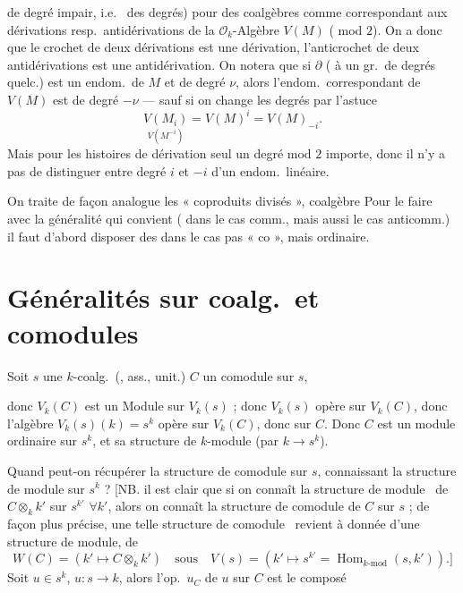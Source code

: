 \documentclass[11pt,a4paper]{article}
\begin{document}
 de degré impair, i.e.\  des degrés) pour des coalgèbres \struck{\ill{}} comme correspondant aux dérivations resp.\ antidérivations de la $\mathcal{O}_k$-Algèbre $V(M)$ ( mod $2$). On a donc que le crochet de deux dérivations est une dérivation, l'anticrochet de deux antidérivations est une antidérivation. On notera que si $\partial$ ( à un gr.\ de degrés quelc.) est un endom.\ de $M$ et de degré $\nu$, alors l'endom.\ correspondant de $V(M)$ est de degré $-\nu$ --- sauf si on change les degrés  \struck{\ill{}} par l'astuce
\[
  \underset{V(M^{-i})}{V(M_i)} = V(M)^i = V(M)_{-i} .
\]
Mais pour les histoires de dérivation  \struck{\ill{}} seul un degré mod $2$ importe, donc il n'y a pas  de distinguer entre degré $i$ et $-i$ d'un endom.\ linéaire.

On traite de façon analogue les « coproduits divisés »,   coalgèbre \ill{} Pour le faire avec la généralité qui convient ( dans le cas comm., \ill{} mais aussi le cas anticomm.) il faut d'abord disposer des  dans le cas pas « co », mais ordinaire.

\section{Généralités sur coalg.\ et comodules}

Soit $s$ une $k$-coalg.\ (\struck{\ill{}}, ass., unit.)
$C$ un comodule  sur $s$,

donc $V_k(C)$ est un Module  sur $V_k(s)$ ; \struck{\ill{}} donc  $V_k(s)$ opère  sur $V_k(C)$, donc l'algèbre $V_k(s)(k) = s^k$ opère  sur $V_k(C)$, donc  sur $C$. Donc $C$ est un module  ordinaire sur $s^k$, et sa structure de $k$-module  (par $k \to s^k$).

Quand peut-on récupérer la structure de comodule  sur $s$, connaissant la structure de module  sur $s^k$ ? [NB. il est clair que si on connaît la structure de \struck{\ill{}} module \ de $C \otimes_k k'$ sur $s^{k'}$ $\forall k'$, alors on connaît la structure de comodule de $C$ sur $s$ ; de façon plus précise, une telle structure de comodule \ revient à  donnée d'une structure de module,  de
\[
  W(C) = (k' \longmapsto C \otimes_k k') \quad \text{sous} \quad V(s) = (k' \longmapsto s^{k'} = \operatorname{Hom}_{k\text{-mod}}(s, k')) \text{.]}
\]
Soit $u \in s^k$, $u : s \to k$, alors l'op.\ $u_C$ de $u$ sur $C$ est le composé
\end{document}
